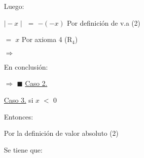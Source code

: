 \documentclass[12pt]{article}
\renewcommand{\qedsymbol}{$\blacksquare$}
\begin{document}
{\textcolor{palatinateblue}{Luego:}} \vspace{0.5cm}

\hspace{4.4cm} $\mid -x \mid$ $=$ $-(-x)$ \hspace{0.8cm} {\textcolor{carrotorange}{Por definición de v.a (2)}} \vspace{0.5cm}

\hspace{5.8cm} $=$ $x$ \hspace{2cm} {\textcolor{carrotorange}{Por axioma 4 (R$_{4}$)}} \vspace{0.5cm}

\hspace{2.8cm} $\Longrightarrow$ \hspace{0.5cm} {\textcolor{vividviolet}{{}}} \vspace{0.5cm}

{\textcolor{palatinateblue}{En conclusión:}} \vspace{0.5cm}

\hspace{2.8cm} $\Longrightarrow$ \hspace{0.9cm} {\textcolor{vividviolet}{{}}}  \hspace{0.5cm} {\textcolor{carrotorange}{\qedsymbol}} \hspace{0.1cm} {\textcolor{palatinateblue}{\underline{Caso 2.}}} \vspace{1cm}

\newpage



{\textcolor{palatinateblue}{{\underline{Caso 3.}} }} si {\Large{$x$ $<$ $0$}}\vspace{0.5cm}

{\textcolor{palatinateblue}{Entonces:}} \vspace{0.5cm}

{\textcolor{carrotorange}{Por la definición de valor absoluto (2)}} \vspace{0.5cm}

{\textcolor{palatinateblue}{Se tiene que:}} \vspace{0.5cm}

\hspace{4.8cm} {\textcolor{vividviolet}{{}}} \vspace{0.5cm}  
\end{document}
